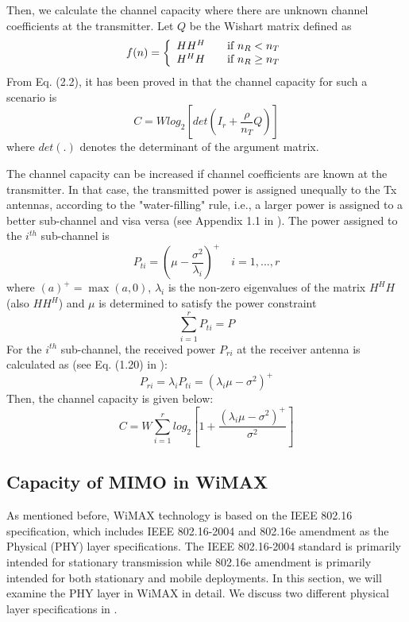 Then, we calculate the channel capacity where there are unknown
channel coefficients at the transmitter. Let $Q$  be the Wishart
matrix defined as
\[f(n) = \left\{
\begin{array}{l l}
  HH^{H}& \quad \mbox{if $n_{R}<n_{T}$}\\
  H^{H}H & \quad \mbox{if $n_{R}\geq n_{T}$}\\ \end{array} \right. \]
From Eq. (2.2), it has been proved in \cite{13} that the channel
capacity for such a scenario is
\begin{equation}
C=Wlog_{2}[det(I_{r}+\frac{\rho}{n_{T}}Q)]
\end{equation}
where $det(.)$ denotes the determinant of the argument matrix.

The channel capacity can be increased if channel coefficients are
known at the transmitter. In that case, the transmitted power is
assigned unequally to the Tx antennas, according to the
"water-filling" rule, i.e., a larger power is assigned to a better
sub-channel and visa versa (see Appendix 1.1 in \cite{13}). The
power assigned to the $i^{th}$ sub-channel is
\[P_{ti}=(\mu-\frac{\sigma^{2}}{\lambda_{i}})^{+} \quad i=1,...,r\]
where $(a)^{+}=\max(a,0)$, $\lambda_{i}$ is the non-zero eigenvalues
of the matrix $H^{H}H$(also $HH^{H}$) and $\mu$ is determined to
satisfy the power constraint
\begin{equation}
\sum_{i=1}^{r}P_{ti}=P
\end{equation}
For the $i^{th}$ sub-channel, the received power $P_{ri}$ at the
receiver antenna is calculated as (see Eq. (1.20) in \cite{13}):
\[P_{ri}=\lambda_{i}P_{ti}=(\lambda_{i}\mu-\sigma^{2})^{+}\]
Then, the channel capacity is given below:
\begin{equation}
C=W\sum_{i=1}^{r}log_{2}[1+\frac{(\lambda_{i}\mu-\sigma^{2})^{+}}{\sigma^{2}}]
\end{equation}

\subsection{Capacity of MIMO in WiMAX}

As mentioned before, WiMAX technology is based on the IEEE 802.16
specification, which includes IEEE 802.16-2004 \cite{31} and 802.16e
amendment as the Physical (PHY) layer specifications. The IEEE
802.16-2004 standard is primarily intended for stationary
transmission while 802.16e amendment is primarily intended for both
stationary and mobile deployments. In this section, we will examine
the PHY layer in WiMAX in detail. We discuss two different physical
layer specifications in \cite{6}.

